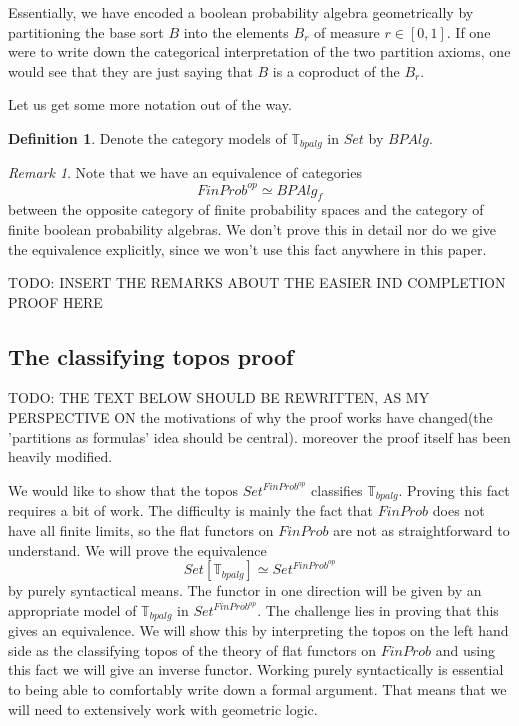 \documentclass[a4paper]{amsproc}
\theoremstyle{plain}
\theoremstyle{definition}
\newtheorem{definition}[theorem]{Definition}
\theoremstyle{remark}
\newtheorem{remark}[theorem]{Remark}
\numberwithin{equation}{section}
\begin{document}
Essentially, we have encoded a boolean probability algebra geometrically by partitioning the base sort $B$ into the elements $B_r$ of measure $r \in [0,1]$. If one were to write down the categorical interpretation of the two partition axioms, one would see that they are just saying that $B$ is a coproduct of the $B_r$.

Let us get some more notation out of the way.

\begin{definition}
Denote the category models of $\mathbb{T}_{bpalg}$ in $Set$ by $BPAlg$.
\end{definition}

\begin{remark}
    Note that we have an equivalence of categories 
    \[
        FinProb^{op} \simeq BPAlg_f
    \]
    between the opposite category of finite probability spaces and the category of finite boolean probability algebras. We don't prove this in detail nor do we give the equivalence explicitly, since we won't use this fact anywhere in this paper.

    TODO: INSERT THE REMARKS ABOUT THE EASIER IND COMPLETION PROOF HERE
\end{remark}

\subsection{The classifying topos proof}

TODO: THE TEXT BELOW SHOULD BE REWRITTEN, AS MY PERSPECTIVE ON the motivations of why the proof works have changed(the 'partitions as formulas' idea should be central). moreover the proof itself has been heavily modified.

We would like to show that the topos $Set^{FinProb^{op}}$ classifies $\mathbb{T}_{bpalg}$. Proving this fact requires a bit of work. The difficulty is mainly the fact that  $FinProb$ does not have all finite limits, so the flat functors on $FinProb$ are not as straightforward to understand. We will prove the equivalence
\[
Set[\mathbb{T}_{bpalg}] \simeq Set^{FinProb^{op}}
\]
by purely syntactical means. The functor in one direction will be given by an appropriate model of $\mathbb{T}_{bpalg}$ in $Set^{FinProb^{op}}$. The challenge lies in proving that this gives an equivalence. We will show this by interpreting the topos on the left hand side as the classifying topos of the theory of flat functors on $FinProb$ and using this fact we will give an inverse functor. Working purely syntactically is essential to being able to comfortably write down a formal argument. That means that we will need to extensively work with geometric logic.
\end{document}
